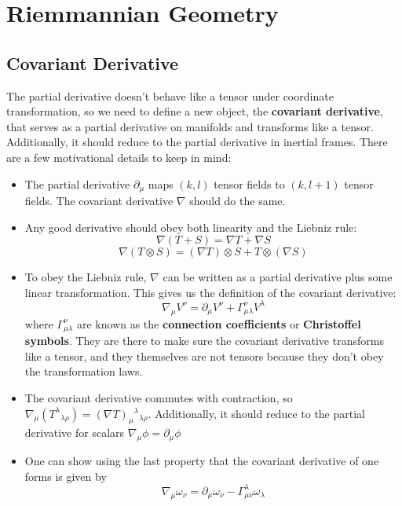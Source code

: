 \documentclass[11pt]{article}
\begin{document}
\section{Riemmannian Geometry}
\subsection{Covariant Derivative}
The partial derivative doesn't behave like a tensor under coordinate transformation, so we need to define a new object, the \textbf{covariant derivative}, that serves as a partial derivative on manifolds and transforms like a tensor. Additionally, it should reduce to the partial derivative in inertial frames. There are
a few motivational details to keep in mind:
\begin{itemize}
    \item The partial derivative \(\partial_\mu\) maps \((k,l)\) tensor fields to \((k, l+1)\) tensor fields. The covariant derivative \(\nabla\) should do the same.

    \item Any good derivative should obey both linearity and the Liebniz rule:
    \[
        \nabla(T + S) = \nabla T + \nabla S
    \]
    \[
        \nabla(T \otimes S) = (\nabla T)\otimes S + T \otimes (\nabla S)
    \]
    \item To obey the Liebniz rule, \(\nabla\) can be written as a partial derivative plus some linear transformation. This gives us the definition of the covariant derivative:
    \[
        \nabla_\mu V^\nu = \partial_\mu V^\nu + \Gamma^\nu_{\mu \lambda}V^\lambda
    \]
    where \(\Gamma^\nu_{\mu \lambda}\) are known as the \textbf{connection coefficients} or \textbf{Christoffel symbols}. They are there to make sure the covariant derivative transforms like a tensor, and they themselves are not tensors because they don't obey the transformation laws.
    
    \item The covariant derivative commutes with contraction, so \(\nabla_\mu(T^\lambda{}_{\lambda\rho}) = (\nabla T)_\mu{}^\lambda{}_{\lambda\rho}\). Additionally, it should reduce to the partial derivative for scalars
    \(\nabla_\mu\phi = \partial_\mu \phi\)

    \item One can show using the last property that the covariant derivative of one forms is given by
    \[
        \nabla_\mu \omega_\nu = \partial_\mu \omega_\nu - \Gamma^\lambda_{\mu \nu}\omega_\lambda
    \]
\end{itemize} 
\end{document}

